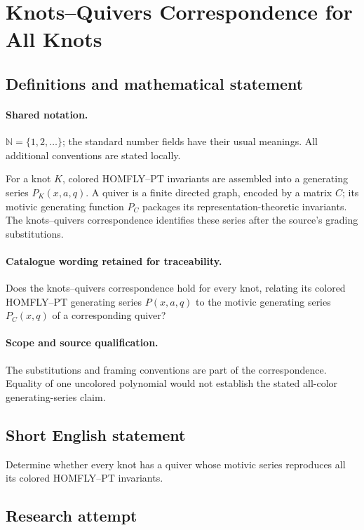 \documentclass[11pt]{article}
\begin{document}
\section{Knots–Quivers Correspondence for All Knots}\label{statement}

\subsection{Definitions and mathematical statement}

\paragraph{Shared notation.}$\mathbb N=\{1,2,\ldots\}$; the standard number fields have their usual meanings. All additional conventions are stated locally.


For a knot $K$, colored HOMFLY--PT invariants are assembled into a generating series $P_K(x,a,q)$. A quiver is a finite directed graph, encoded by a matrix $C$; its motivic generating function $P_C$ packages its representation-theoretic invariants. The knots--quivers correspondence identifies these series after the source's grading substitutions.

\paragraph{Catalogue wording retained for traceability.}
Does the knots–quivers correspondence hold for every knot, relating its colored HOMFLY–PT generating series $P(x,a,q)$ to the motivic generating series $P_C(x,q)$ of a corresponding quiver?

\paragraph{Scope and source qualification.}The substitutions and framing conventions are part of the correspondence. Equality of one uncolored polynomial would not establish the stated all-color generating-series claim.
\subsection{Short English statement}
Determine whether every knot has a quiver whose motivic series reproduces all its colored HOMFLY--PT invariants.
\subsection{Research attempt}
\end{document}
